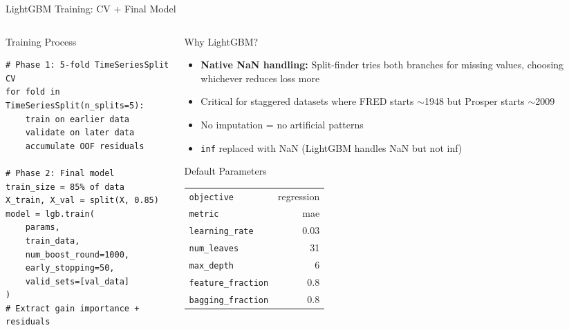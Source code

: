 \documentclass[aspectratio=169,10pt]{beamer}
\begin{document}
\begin{frame}[fragile]{LightGBM Training: CV + Final Model}
\begin{columns}[T]
\begin{column}{0.48\textwidth}
\begin{block}{Training Process}
\begin{lstlisting}[style=pseudo]
# Phase 1: 5-fold TimeSeriesSplit CV
for fold in TimeSeriesSplit(n_splits=5):
    train on earlier data
    validate on later data
    accumulate OOF residuals

# Phase 2: Final model
train_size = 85% of data
X_train, X_val = split(X, 0.85)
model = lgb.train(
    params,
    train_data,
    num_boost_round=1000,
    early_stopping=50,
    valid_sets=[val_data]
)
# Extract gain importance + residuals
\end{lstlisting}
\end{block}
\end{column}
\begin{column}{0.48\textwidth}
\begin{block}{Why LightGBM?}
\footnotesize
\begin{itemize}
  \item \textbf{Native NaN handling:} Split-finder tries both branches for missing values, choosing whichever reduces loss more
  \item Critical for staggered datasets where FRED starts $\sim$1948 but Prosper starts $\sim$2009
  \item No imputation = no artificial patterns
  \item \texttt{inf} replaced with NaN (LightGBM handles NaN but not inf)
\end{itemize}
\end{block}

\begin{block}{Default Parameters}
\scriptsize
\begin{tabular}{@{}lr@{}}
\toprule
\texttt{objective} & regression \\
\texttt{metric} & mae \\
\texttt{learning\_rate} & 0.03 \\
\texttt{num\_leaves} & 31 \\
\texttt{max\_depth} & 6 \\
\texttt{feature\_fraction} & 0.8 \\
\texttt{bagging\_fraction} & 0.8 \\
\bottomrule
\end{tabular}
\end{block}
\end{column}
\end{columns}
\end{frame}
\end{document}
